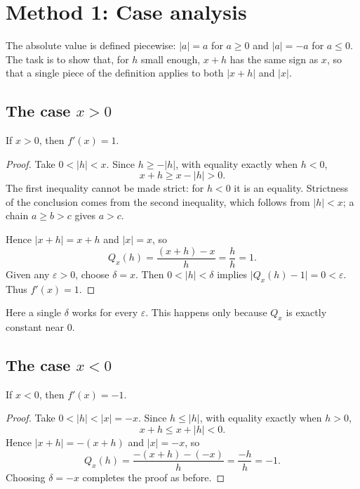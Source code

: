 \documentclass{essay}
\newcommand{\abs}[1]{\lvert #1 \rvert}
\begin{document}
\section{Method 1: Case analysis}

The absolute value is defined piecewise:
$\abs{a} = a$ for $a \geq 0$ and $\abs{a} = -a$ for $a \leq 0$.
The task is to show that, for $h$ small enough, $x + h$ has the same sign as $x$,
so that a single piece of the definition applies to both $\abs{x+h}$ and $\abs{x}$.

\subsection{The case $x > 0$}

\begin{proposition}
  If $x > 0$, then $f'(x) = 1$.
\end{proposition}

\begin{proof}
  Take $0 < \abs{h} < x$. Since $h \geq -\abs{h}$, with equality exactly when
  $h < 0$,
  \[
    x + h \geq x - \abs{h} > 0.
  \]
  The first inequality cannot be made strict: for $h < 0$ it is an equality.
  Strictness of the conclusion comes from the second inequality, which follows
  from $\abs{h} < x$; a chain $a \geq b > c$ gives $a > c$.

  Hence $\abs{x+h} = x + h$ and $\abs{x} = x$, so
  \[
    Q_x(h) = \frac{(x+h) - x}{h} = \frac{h}{h} = 1.
  \]
  Given any $\varepsilon > 0$, choose $\delta = x$. Then
  $0 < \abs{h} < \delta$ implies $\abs{Q_x(h) - 1} = 0 < \varepsilon$.
  Thus $f'(x) = 1$.
\end{proof}

Here a single $\delta$ works for every $\varepsilon$. This happens only because
$Q_x$ is exactly constant near $0$.

\subsection{The case $x < 0$}

\begin{proposition}
  If $x < 0$, then $f'(x) = -1$.
\end{proposition}

\begin{proof}
  Take $0 < \abs{h} < \abs{x} = -x$. Since $h \leq \abs{h}$, with equality
  exactly when $h > 0$,
  \[
    x + h \leq x + \abs{h} < 0.
  \]
  Hence $\abs{x+h} = -(x+h)$ and $\abs{x} = -x$, so
  \[
    Q_x(h) = \frac{-(x+h) - (-x)}{h} = \frac{-h}{h} = -1.
  \]
  Choosing $\delta = -x$ completes the proof as before.
\end{proof}
\end{document}
